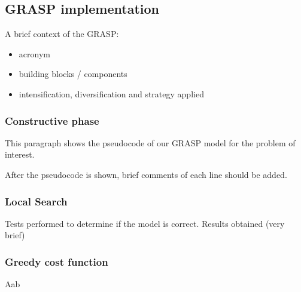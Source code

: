 \subsection{GRASP implementation}

A brief context of the GRASP:
\begin{itemize}
	\item acronym
	\item building blocks / components
	\item intensification, diversification and strategy applied
\end{itemize}

\subsubsection{Constructive phase}

This paragraph shows the pseudocode of our GRASP model for the problem of interest.

After the pseudocode is shown, brief comments of each line should be added.



\subsubsection{Local Search}

Tests performed to determine if the model is correct. Results obtained (very brief)

\subsubsection{Greedy cost function}

Aab


\pagebreak